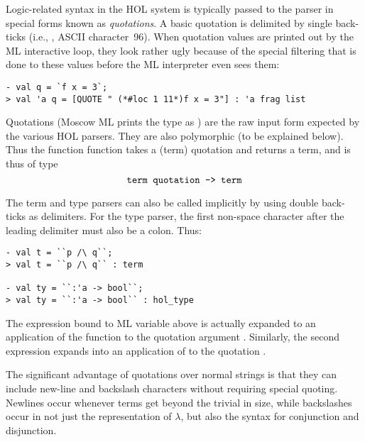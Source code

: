 Logic-related syntax in the HOL system is typically passed to the
parser in special forms known as \emph{quotations}.  A basic quotation
is delimited by single back-ticks (i.e., , ASCII character~96).  When
quotation values are printed out by the ML interactive loop, they look
rather ugly because of the special filtering that is done to these
values before the ML interpreter even sees them:
\setcounter{sessioncount}{0}
\begin{session}
\begin{verbatim}
- val q = `f x = 3`;
> val 'a q = [QUOTE " (*#loc 1 11*)f x = 3"] : 'a frag list
\end{verbatim}
\end{session}
Quotations (Moscow ML prints the type as ) are the
raw input form expected by the various HOL parsers.  They are also
polymorphic (to be explained below).  Thus the function
 function takes a (term) quotation and returns a term,
and is thus of type \[ \ml{term quotation -> term}
\]

The term and type parsers can also be called implicitly by using
double back-ticks as delimiters.  For the type parser, the first
non-space character after the leading delimiter must also be a colon.
Thus:
\begin{session}
\begin{verbatim}
- val t = ``p /\ q``;
> val t = ``p /\ q`` : term

- val ty = ``:'a -> bool``;
> val ty = ``:'a -> bool`` : hol_type
\end{verbatim}
\end{session}

The expression bound to ML variable  above is actually expanded
to an application of the function  to the quotation
argument .  Similarly, the second expression expands
into an application of  to the quotation .

The significant advantage of quotations over normal \ML{} strings is
that they can include new-line and backslash characters without
requiring special quoting.  Newlines occur whenever terms get beyond
the trivial in size, while backslashes occur in not just the
representation of $\lambda$, but also the syntax for conjunction and
disjunction.

